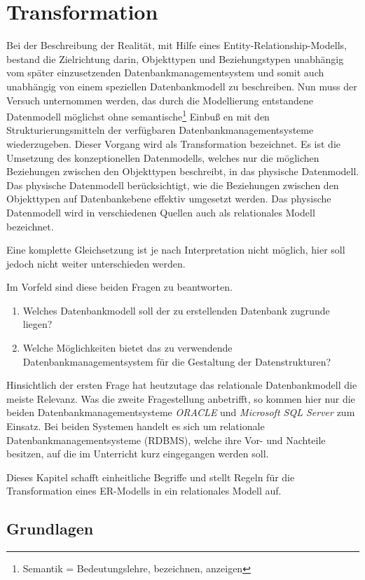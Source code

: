 \chapter{Transformation}
\chaptertoc{}
\cleardoubleevenpage

Bei der Beschreibung der Realität, mit Hilfe eines Entity-Relationship-Modells, bestand die Zielrichtung darin, Objekttypen und Beziehungstypen unabhängig vom später einzusetzenden Datenbankmanagementsystem und somit auch unabhängig von einem speziellen Datenbankmodell zu beschreiben. Nun muss der Versuch unternommen werden, das durch die Modellierung entstandene Datenmodell möglichst ohne semantische\footnote{Semantik = Bedeutungslehre, bezeichnen, anzeigen} Einbuß en mit den Strukturierungsmitteln der verfügbaren Datenbankmanagementsysteme wiederzugeben. Dieser Vorgang wird als Transformation bezeichnet. Es ist die Umsetzung des konzeptionellen Datenmodells, welches nur die möglichen Beziehungen zwischen den Objekttypen beschreibt, in das physische Datenmodell. Das physische Datenmodell berücksichtigt, wie die Beziehungen zwischen den Objekttypen auf Datenbankebene effektiv umgesetzt werden. Das physische Datenmodell wird in verschiedenen Quellen auch als relationales Modell
bezeichnet.

Eine komplette Gleichsetzung ist je nach Interpretation nicht möglich, hier soll jedoch nicht weiter unterschieden werden.

Im Vorfeld sind diese beiden Fragen zu beantworten.
\begin{enumerate}
    \item Welches Datenbankmodell soll der zu erstellenden Datenbank zugrunde liegen?
    \item Welche Möglichkeiten bietet das zu verwendende Datenbankmanagementsystem für die Gestaltung der Datenstrukturen?
\end{enumerate}
Hinsichtlich der ersten Frage hat heutzutage das relationale Datenbankmodell die meiste Relevanz. Was die zweite Fragestellung anbetrifft, so kommen hier nur die beiden Datenbankmanagementsysteme \textit{ORACLE} und \textit{Microsoft SQL Server} zum Einsatz. Bei beiden Systemen handelt es sich um relationale Datenbankmanagementsysteme (RDBMS), welche ihre Vor- und Nachteile besitzen, auf die im Unterricht kurz eingegangen werden soll.

Dieses Kapitel schafft einheitliche Begriffe und stellt Regeln für die Transformation eines ER-Modells in ein relationales Modell auf.
\clearpage
\section{Grundlagen}
